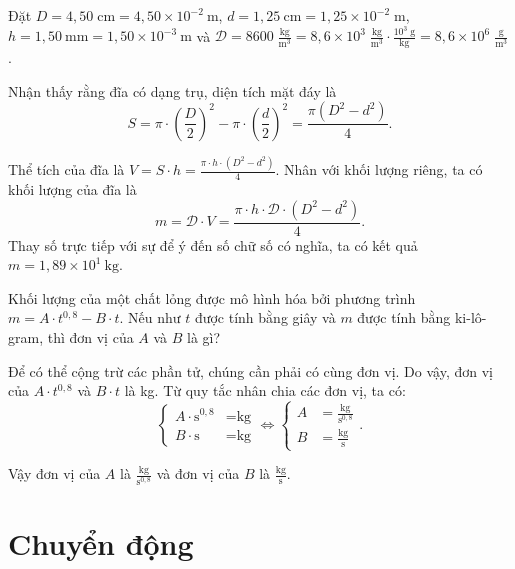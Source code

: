 \documentclass[a4paper, titlepage, openany]{book}
\newcounter{exercise}
\newcounter{solution}
\begin{document}
\solution

Đặt $D=4{,}50\;\text{cm}=4{,}50\times 10^{-2}\ \text{m}$, $d=1{,}25\ \text{cm}=1{,}25\times 10^{-2}\;\text{m}$, $h=1{,}50\ \text{mm}=1{,}50\times 10^{-3}\ \text{m}$ và $\mathcal{D}=8600\;\frac{\text{kg}}{\text{m}^3}=8{,}6\times 10^3\;\frac{\text{kg}}{\text{m}^3}\cdot \frac{10^3\;\text{g}}{\text{kg}}=8{,}6\times 10^6\;\frac{\text{g}}{\text{m}^3}$.

Nhận thấy rằng đĩa có dạng trụ, diện tích mặt đáy là $$S=\pi\cdot \left(\frac{D}{2}\right)^2-\pi\cdot \left(\frac{d}{2}\right)^2=\frac{\pi \left(D^2-d^2\right)}{4}.$$

Thể tích của đĩa là $V=S\cdot h=\frac{\pi \cdot h\cdot \left(D^2-d^2\right)}{4}.$ Nhân với khối lượng riêng, ta có khối lượng của đĩa là $$m=\mathcal{D}\cdot V=\frac{\pi \cdot h\cdot \mathcal{D}\cdot \left(D^2-d^2\right)}{4}.$$ Thay số trực tiếp với sự để ý đến số chữ số có nghĩa, ta có kết quả $m=\boxed{1{,}89\times 10^1\ \text{kg}}$.

\exercise Khối lượng của một chất lỏng được mô hình hóa bởi phương trình $m=A\cdot t^{0{,}8}-B\cdot t$. Nếu như $t$ được tính bằng giây và $m$ được tính bằng ki-lô-gram, thì đơn vị của $A$ và $B$ là gì?

\solution

Để có thể cộng trừ các phần tử, chúng cần phải có cùng đơn vị. Do vậy, đơn vị của $A\cdot t^{0{,}8}$ và $B\cdot t$ là kg. Từ quy tắc nhân chia các đơn vị, ta có:
\begin{equation*}
   \begin{cases}
     A\cdot \text{s}^{0{,}8} &=\text{kg} \\
     B\cdot\text{s} &=\text{kg}
   \end{cases}
   \iff
   \begin{cases}
      A &=\frac{\text{kg}}{\text{s}^{0{,}8}} \\
      B&=\frac{\text{kg}}{\text{s}}
   \end{cases}.
\end{equation*}

Vậy đơn vị của $A$ là $\boxed{\frac{\text{kg}}{\text{s}^{0{,}8}}}$ và đơn vị của $B$ là $\boxed{\frac{\text{kg}}{\text{s}}}$.

\chapter{Chuyển động}
\end{document}
